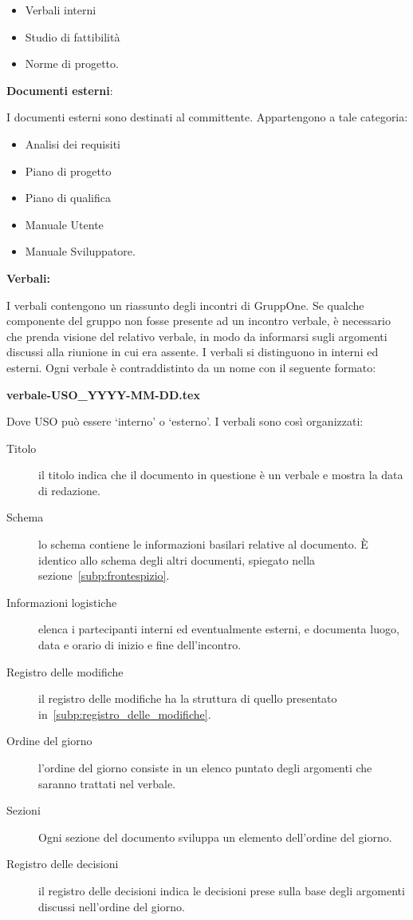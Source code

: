 \documentclass[../../norme-di-progetto.tex]{subfiles}
\begin{document}
\begin{itemize}
  \item Verbali interni
  \item Studio di fattibilità
  \item Norme di progetto.
\end{itemize}


\textbf{Documenti esterni}:

I documenti esterni sono destinati al committente. Appartengono a tale categoria:

\begin{itemize}
  \item Analisi dei requisiti
  \item Piano di progetto
  \item Piano di qualifica
  \item Manuale Utente
  \item Manuale Sviluppatore.
\end{itemize}


\textbf{Verbali:}

I verbali contengono un riassunto degli incontri di GruppOne.
Se qualche componente del gruppo non fosse presente ad un incontro verbale, è necessario che prenda visione del relativo verbale, in modo da informarsi sugli argomenti discussi alla riunione in cui era assente.
I verbali si distinguono in interni ed esterni. Ogni verbale è contraddistinto da un nome con il seguente formato:
\begin{center}
  \textbf{verbale-USO\_YYYY-MM-DD.tex}
\end{center}
Dove USO può essere `interno' o `esterno'. I verbali sono così organizzati:

\begin{description}
  \item [Titolo] il titolo indica che il documento in questione è un verbale e mostra la data di redazione.
  \item [Schema] lo schema contiene le informazioni basilari relative al documento. È identico allo schema degli altri documenti, spiegato nella sezione~\ref{subp:frontespizio}.
  \item [Informazioni logistiche] elenca i partecipanti interni ed eventualmente esterni, e documenta luogo, data e orario di inizio e fine dell'incontro.
  \item [Registro delle modifiche] il registro delle modifiche ha la struttura di quello presentato in~\ref{subp:registro_delle_modifiche}.
  \item [Ordine del giorno] l'ordine del giorno consiste in un elenco puntato degli argomenti che saranno trattati nel verbale.
  \item [Sezioni] Ogni sezione del documento sviluppa un elemento dell'ordine del giorno.
  \item [Registro delle decisioni] il registro delle decisioni indica le decisioni prese sulla base degli argomenti discussi nell'ordine del giorno.
\end{description}
\end{document}

